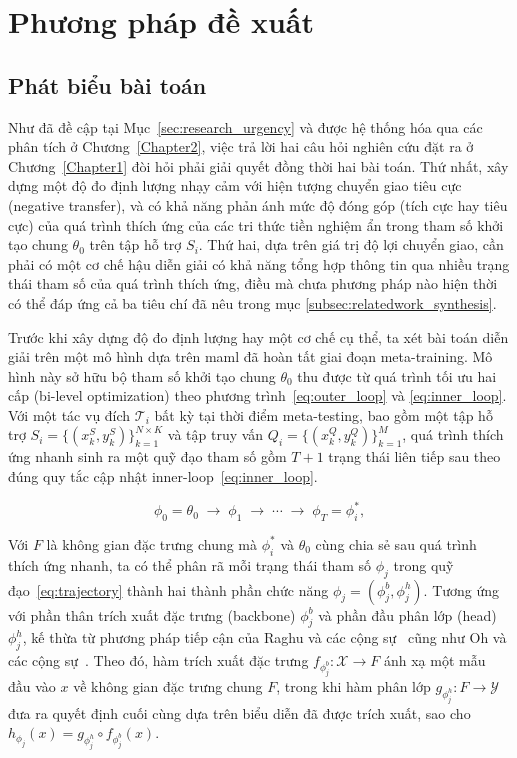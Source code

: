 \chapter{Phương pháp đề xuất}
\label{Chapter3}

\section{Phát biểu bài toán}
\label{sec:problem_statement}

Như đã đề cập tại Mục~\ref{sec:research_urgency} và được hệ thống hóa qua các phân tích ở Chương~\ref{Chapter2}, việc trả lời hai câu hỏi nghiên cứu đặt ra ở Chương~\ref{Chapter1} đòi hỏi phải giải quyết đồng thời hai bài toán. Thứ nhất, xây dựng một độ đo định lượng nhạy cảm với hiện tượng chuyển giao tiêu cực (negative transfer), và có khả năng phản ánh mức độ đóng góp (tích cực hay tiêu cực) của quá trình thích ứng của các tri thức tiền nghiệm ẩn trong tham số khởi tạo chung $\theta_0$ trên tập hỗ trợ $S_i$. Thứ hai, dựa trên giá trị độ lợi chuyển giao, cần phải có một cơ chế hậu diễn giải có khả năng tổng hợp thông tin qua nhiều trạng thái tham số của quá trình thích ứng, điều mà chưa phương pháp nào hiện thời có thể đáp ứng cả ba tiêu chí đã nêu trong mục \ref{subsec:relatedwork_synthesis}.

Trước khi xây dựng độ đo định lượng hay một cơ chế cụ thể, ta xét bài toán diễn giải trên một mô hình dựa trên \acrshort{maml} đã hoàn tất giai đoạn meta-training. Mô hình này sở hữu bộ tham số khởi tạo chung $\theta_0$ thu được từ quá trình tối ưu hai cấp (bi-level optimization) theo phương trình~\eqref{eq:outer_loop} và \eqref{eq:inner_loop}. Với một tác vụ đích $\mathcal{T}_i$ bất kỳ tại thời điểm meta-testing, bao gồm một tập hỗ trợ $S_i = \{(x_k^S, y_k^S)\}_{k=1}^{N\times K}$ và tập truy vấn $Q_i = \{(x_k^Q, y_k^Q)\}_{k=1}^{M}$, quá trình thích ứng nhanh sinh ra một quỹ đạo tham số gồm $T+1$ trạng thái liên tiếp sau theo đúng quy tắc cập nhật inner-loop~\eqref{eq:inner_loop}.

\begin{equation}
    \phi_{0} = \theta_0 \;\longrightarrow\; \phi_{1} \;\longrightarrow\; \cdots \;\longrightarrow\; \phi_{T} = \phi_i^*,
    \label{eq:trajectory}
\end{equation}

Với $F$ là không gian đặc trưng chung mà $\phi_i^*$ và $\theta_0$ cùng chia sẻ sau quá trình thích ứng nhanh, ta có thể phân rã mỗi trạng thái tham số $\phi_j$ trong quỹ đạo~\eqref{eq:trajectory} thành hai thành phần chức năng $\phi_j = (\phi_j^{b}, \phi_j^{h})$. Tương ứng với phần thân trích xuất đặc trưng (backbone) $\phi_j^{b}$ và phần đầu phân lớp (head) $\phi_j^{h}$, kế thừa từ phương pháp tiếp cận của Raghu và các cộng sự~\cite{raghu2019rapid} cũng như Oh và các cộng sự~\cite{oh2020boil}. Theo đó, hàm trích xuất đặc trưng $f_{\phi_j^{b}}: \mathcal{X} \rightarrow F$ ánh xạ một mẫu đầu vào $x$ về không gian đặc trưng chung $F$, trong khi hàm phân lớp $g_{\phi_j^{h}}: F \rightarrow \mathcal{Y}$ đưa ra quyết định cuối cùng dựa trên biểu diễn đã được trích xuất, sao cho $h_{\phi_j}(x) = g_{\phi_j^{h}} \circ f_{\phi_j^{b}}(x)$.

